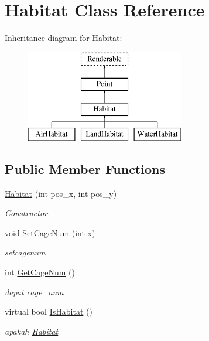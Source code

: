 \hypertarget{class_habitat}{}\section{Habitat Class Reference}
\label{class_habitat}
Inheritance diagram for Habitat\+:\begin{figure}[H]
\begin{center}
\leavevmode
\includegraphics[height=4.000000cm]{class_habitat}
\end{center}
\end{figure}
\subsection*{Public Member Functions}
\begin{DoxyCompactItemize}
\item 
\hyperlink{class_habitat_a74bdfca6c20b314d7fa79c95e62f2b48}{Habitat} (int pos\+\_\+x, int pos\+\_\+y)
\begin{DoxyCompactList}\small\item\em Constructor. \end{DoxyCompactList}\item 
void \hyperlink{class_habitat_abd7810035d5e636f1062578387ff71be}{Set\+Cage\+Num} (int \hyperlink{class_point_a8c779e11e694b20e0946105a9f5de842}{x})
\begin{DoxyCompactList}\small\item\em setcagenum \end{DoxyCompactList}\item 
int \hyperlink{class_habitat_add32256a4a94564e4151e6b7cd4e5277}{Get\+Cage\+Num} ()
\begin{DoxyCompactList}\small\item\em dapat cage\+\_\+num \end{DoxyCompactList}\item 
virtual bool \hyperlink{class_habitat_a94e5f56b954f701e6a37007951ff9b62}{Is\+Habitat} ()
\begin{DoxyCompactList}\small\item\em apakah \hyperlink{class_habitat}{Habitat} \end{DoxyCompactList}\end{DoxyCompactItemize}
